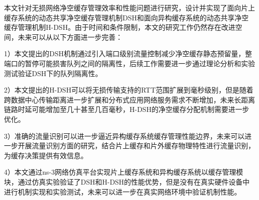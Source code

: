 本文针对无损网络净空缓存管理效率和性能问题进行研究，设计并实现了面向片上缓存系统的动态共享净空缓存管理机制DSH和面向异构缓存系统的动态共享净空缓存管理机制H-DSH。由于时间和条件限制，本文的研究工作仍然存在改进空间，未来可以从以下方面进一步完善：

1）本文提出的DSH机制通过引入端口级别流量控制减少净空缓存静态预留量，整端口的暂停可能损害队列之间的隔离性，后续工作需要进一步通过理论分析和实验测试验证DSH下的队列隔离性。

2）本文提出的H-DSH可以将无损传输支持的RTT范围扩展到毫秒级别，但是随着跨数据中心传输距离进一步扩展和分布式应用网络服务需求不断增加，未来长距离链路时延可能增加至几十甚至几百毫秒，H-DSH的净空缓存分配机制需要进一步优化。

3）准确的流量识别可以进一步逼近异构缓存系统缓存管理性能边界，未来可以进一步开展流量识别方面的研究，结合片上缓存和片外缓存物理特性进行流量识别，为缓存决策提供有效信息。

4）本文通过ns-3网络仿真平台实现片上缓存系统和异构缓存系统以缓存管理模块，通过仿真实验验证了DSH和H-DSH的性能优势，但是没有在真实硬件设备中进行机制实现和实验测试，未来可以进一步在真实网络环境中验证机制性能。